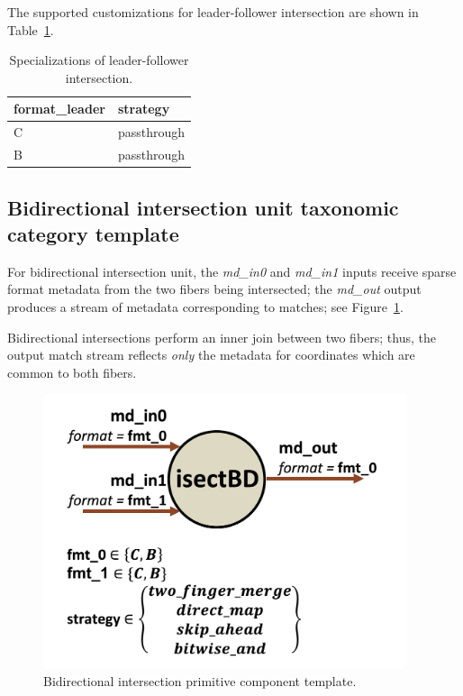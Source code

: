 The supported customizations for leader-follower intersection are shown in Table~\ref{tab:IntersectionLeaderFollower_specializations}.

\begin{table}[H]
\centering
\begin{tabular}{ll}
\toprule
 format\_leader   & strategy    \\
\midrule
 C               & passthrough \\
 B               & passthrough \\
\bottomrule
\end{tabular}
\caption{Specializations of leader-follower intersection.}
\label{tab:IntersectionLeaderFollower_specializations}
\end{table}

\subsection{Bidirectional intersection unit taxonomic category template}

For bidirectional intersection unit, the \textit{md\_in0} and \textit{md\_in1} inputs receive sparse format metadata from the two fibers being intersected; the \textit{md\_out} output produces a stream of metadata corresponding to matches; see Figure~\ref{fig:isectbd}.

Bidirectional intersections perform an inner join between two fibers; thus, the output match stream reflects \textit{only} the metadata for coordinates which are common to both fibers.

\begin{figure}[H]
    \centering
    \includegraphics[width=0.95\textwidth]{figures/isectbd.png}
    \caption{Bidirectional intersection primitive component template.}
    \label{fig:isectbd}
\end{figure}

